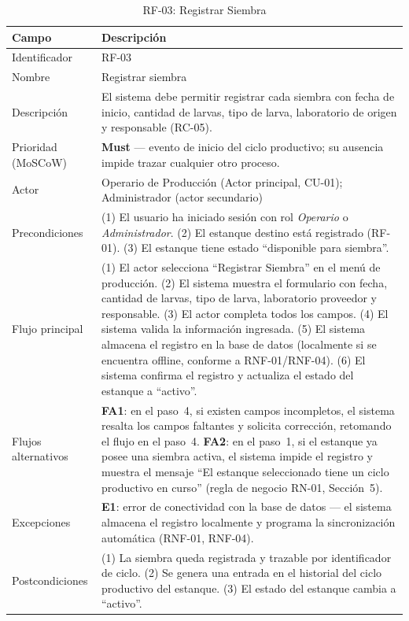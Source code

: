 \documentclass[12pt,a4paper]{article}
\begin{document}
\begin{longtable}{|p{3.6cm}|p{10.4cm}|}
\caption{RF-03: Registrar Siembra} \\
\hline
\textbf{Campo} & \textbf{Descripción} \\
\hline
\endfirsthead
Identificador & RF-03 \\ \hline
Nombre & Registrar siembra \\ \hline
Descripción & El sistema debe permitir registrar cada siembra con fecha de
inicio, cantidad de larvas, tipo de larva, laboratorio de origen y responsable
(RC-05). \\ \hline
Prioridad (MoSCoW) & \textbf{Must} --- evento de inicio del ciclo productivo;
su ausencia impide trazar cualquier otro proceso. \\ \hline
Actor & Operario de Producción (Actor principal, CU-01); Administrador (actor
secundario) \\ \hline
Precondiciones & (1) El usuario ha iniciado sesión con rol \textit{Operario} o
\textit{Administrador}. (2) El estanque destino está registrado (RF-01).
(3) El estanque tiene estado ``disponible para siembra''. \\ \hline
Flujo principal &
(1) El actor selecciona ``Registrar Siembra'' en el menú de producción.
(2) El sistema muestra el formulario con fecha, cantidad de larvas, tipo de
larva, laboratorio proveedor y responsable.
(3) El actor completa todos los campos.
(4) El sistema valida la información ingresada.
(5) El sistema almacena el registro en la base de datos (localmente si se
encuentra offline, conforme a RNF-01/RNF-04).
(6) El sistema confirma el registro y actualiza el estado del estanque a
``activo''. \\ \hline
Flujos alternativos &
\textbf{FA1}: en el paso~4, si existen campos incompletos, el sistema resalta
los campos faltantes y solicita corrección, retomando el flujo en el paso~4.
\textbf{FA2}: en el paso~1, si el estanque ya posee una siembra activa, el
sistema impide el registro y muestra el mensaje ``El estanque seleccionado
tiene un ciclo productivo en curso'' (regla de negocio RN-01, Sección~5). \\ \hline
Excepciones & \textbf{E1}: error de conectividad con la base de datos --- el
sistema almacena el registro localmente y programa la sincronización
automática (RNF-01, RNF-04). \\ \hline
Postcondiciones & (1) La siembra queda registrada y trazable por identificador
de ciclo. (2) Se genera una entrada en el historial del ciclo productivo del
estanque. (3) El estado del estanque cambia a ``activo''. \\ \hline

\end{longtable}
\end{document}
